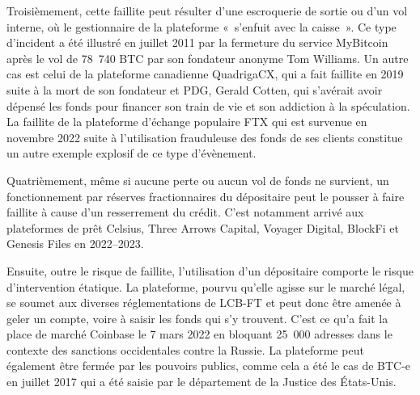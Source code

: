 Troisièmement, cette faillite peut résulter d'une escroquerie de sortie ou d'un vol interne, où le gestionnaire de la plateforme «~s'enfuit avec la caisse~». Ce type d'incident a été illustré en juillet 2011 par la fermeture du service MyBitcoin après le vol de 78~740 BTC par son fondateur anonyme Tom Williams. Un autre cas est celui de la plateforme canadienne QuadrigaCX, qui a fait faillite en 2019 suite à la mort de son fondateur et PDG, Gerald Cotten, qui s'avérait avoir dépensé les fonds pour financer son train de vie et son addiction à la spéculation. La faillite de la plateforme d'échange populaire FTX qui est survenue en novembre 2022 suite à l'utilisation frauduleuse des fonds de ses clients constitue un autre exemple explosif de ce type d'évènement.

Quatrièmement, même si aucune perte ou aucun vol de fonds ne survient, un fonctionnement par réserves fractionnaires du dépositaire peut le pousser à faire faillite à cause d'un resserrement du crédit. C'est notamment arrivé aux plateformes de prêt Celsius, Three Arrows Capital, Voyager Digital, BlockFi et Genesis Files en 2022--2023.

Ensuite, outre le risque de faillite, l'utilisation d'un dépositaire comporte le risque d'intervention étatique. La plateforme, pourvu qu'elle agisse sur le marché légal, se soumet aux diverses réglementations de LCB-FT et peut donc être amenée à geler un compte, voire à saisir les fonds qui s'y trouvent. C'est ce qu'a fait la place de marché Coinbase le 7 mars 2022 en bloquant 25~000 adresses dans le contexte des sanctions occidentales contre la Russie. La plateforme peut également être fermée par les pouvoirs publics, comme cela a été le cas de BTC-e en juillet 2017 qui a été saisie par le département de la Justice des États-Unis.

